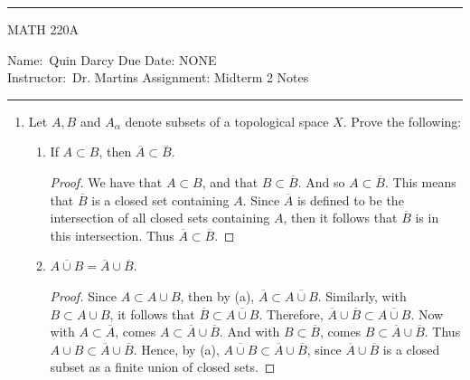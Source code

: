 \documentclass[12pt]{article}
\theoremstyle{definition}
\begin{document}
 \thispagestyle{empty}\hrule

    \begin{center}
        \vspace{.4cm} { \large MATH 220A}
    \end{center}
    {Name:\ Quin Darcy \hspace{\fill} Due Date: NONE \\
    { Instructor:}\ Dr. Martins \hspace{\fill} Assignment:
    Midterm 2 Notes \\ \hrule}
    \begin{enumerate}
            \item Let $A, B$ and $A_{\alpha}$ denote subsets of a topological space $X$. Prove the following:
            \begin{enumerate}
            \item If $A\subset B$, then $\overline{A}\subset \overline{B}$.
                \begin{proof}
                    We have that $A\subset B$, and that $B\subset \overline{B}$. And so 
                    $A\subset\overline{B}$. This means that $\overline{B}$ is a closed set 
                    containing $A$. Since $\overline{A}$ is defined to be the intersection 
                    of all closed sets containing $A$, then it follows that $\overline{B}$ 
                    is in this intersection. Thus $\overline{A}\subset\overline{B}$.
                \end{proof}
            \item $\overline{A\cup B}=\overline{A}\cup\overline{B}$.
                \begin{proof}
                    Since $A\subset A\cup B$, then by (a), $\overline{A}\subset\overline{A\cup B}$. 
                    Similarly, with $B\subset A\cup B$, it follows that 
                    $\overline{B}\subset\overline{A\cup B}$. Therefore, 
                    $\overline{A}\cup\overline{B}\subset\overline{A\cup B}$. Now with 
                    $A\subset \overline{A}$, comes $A\subset\overline{A}\cup\overline{B}$. 
                    And with $B\subset\overline{B}$, comes $B\subset\overline{A}\cup\overline{B}$. 
                    Thus $A\cup B\subset\overline{A}\cup\overline{B}$. Hence, by (a), 
                    $\overline{A\cup B}\subset\overline{A}\cup\overline{B}$, since 
                    $\overline{A}\cup\overline{B}$ is a closed subset as a finite 
                    union of closed sets.
                \end{proof}

\end{enumerate}
\end{enumerate}
\end{document}
